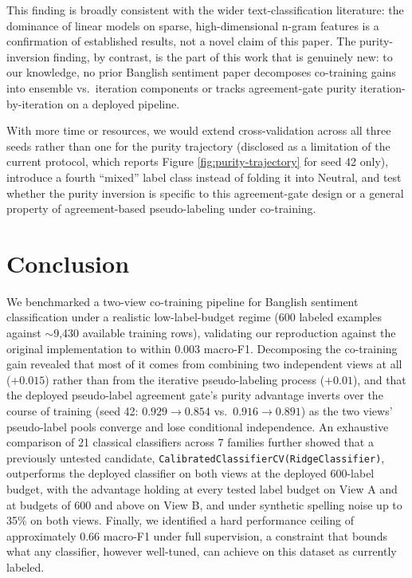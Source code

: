 \documentclass[conference]{IEEEtran}
\begin{document}
This finding is broadly consistent with the wider text-classification
literature: the dominance of linear models on sparse, high-dimensional
n-gram features \citep{cavnar1994ngram} is a confirmation of established
results, not a novel claim of this paper. The purity-inversion finding, by
contrast, is the part of this work that is genuinely new: to our knowledge,
no prior Banglish sentiment paper decomposes co-training gains into ensemble
vs.\ iteration components or tracks agreement-gate purity iteration-by-iteration
on a deployed pipeline.

With more time or resources, we would extend cross-validation across all
three seeds rather than one for the purity trajectory (disclosed as a
limitation of the current protocol, which reports Figure
\ref{fig:purity-trajectory} for seed 42 only), introduce a fourth ``mixed''
label class instead of folding it into Neutral, and test whether the purity
inversion is specific to this agreement-gate design or a general property of
agreement-based pseudo-labeling under co-training.

\section{Conclusion}
\label{sec:conclusion}

We benchmarked a two-view co-training pipeline for Banglish sentiment
classification under a realistic low-label-budget regime (600 labeled
examples against $\sim$9{,}430 available training rows), validating our
reproduction against the original implementation to within 0.003 macro-F1.
Decomposing the co-training gain revealed that most of it comes from
combining two independent views at all ($+0.015$) rather than from the
iterative pseudo-labeling process ($+0.01$), and that the deployed
pseudo-label agreement gate's purity advantage inverts over the course of
training (seed 42: $0.929\to0.854$ vs.\ $0.916\to0.891$) as the two views'
pseudo-label pools converge and lose conditional independence. An exhaustive
comparison of 21 classical classifiers across 7 families further showed that
a previously untested candidate, \texttt{CalibratedClassifierCV(RidgeClassifier)},
outperforms the deployed classifier on both views at the deployed 600-label
budget, with the advantage holding at every tested label budget on View A
and at budgets of 600 and above on View B, and under synthetic spelling
noise up to 35\% on both views. Finally, we identified a hard performance
ceiling of approximately 0.66 macro-F1 under full supervision, a constraint
that bounds what any classifier, however well-tuned, can achieve on this
dataset as currently labeled.
\end{document}
